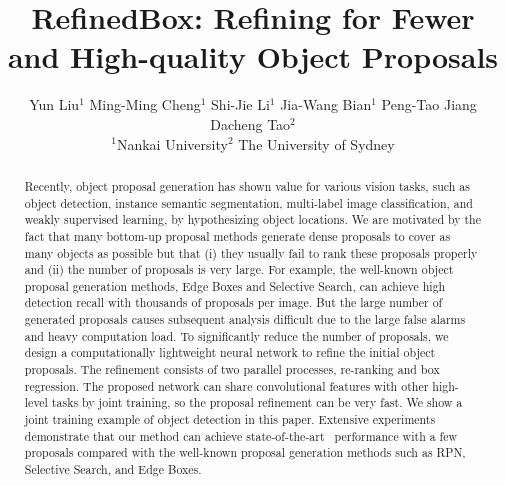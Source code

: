 \documentclass[10pt,twocolumn,letterpaper]{article}
\def\sArt{{state-of-the-art~}}
\begin{document}
\title{RefinedBox: Refining for Fewer and High-quality Object Proposals}

\author{Yun Liu$^1$ \quad Ming-Ming Cheng$^1$ \quad Shi-Jie Li$^1$
\quad Jia-Wang Bian$^1$ \quad Peng-Tao Jiang \quad Dacheng Tao$^2$ \\
$^1$Nankai University\quad\quad$^2$ The University of Sydney
}

\maketitle


\begin{abstract}
%
%
Recently, object proposal generation has shown value for various 
vision tasks, such as object detection, instance semantic segmentation,
multi-label image classification, and weakly supervised learning, by 
hypothesizing object locations.
%
We are motivated by the fact that many bottom-up proposal methods generate 
dense proposals to cover as many objects as possible but that 
(i) they usually fail to rank these proposals properly and 
(ii) the number of proposals is very large.
%
For example, the well-known object proposal generation methods, Edge Boxes
and Selective Search, can achieve high detection recall with thousands of
proposals per image.
But the large number of generated proposals causes subsequent analysis
difficult due to the large false alarms and heavy computation load.
%
To significantly reduce the number of proposals, we design a computationally
lightweight neural network to refine the initial object proposals.
The refinement consists of two parallel processes, re-ranking and box regression.
The proposed network can share convolutional features with other high-level 
tasks by joint training, so the proposal refinement can be very fast.
We show a joint training example of object detection in this paper.
%
Extensive experiments demonstrate that our method can achieve \sArt 
performance with a few proposals compared with the well-known proposal 
generation methods such as RPN, Selective Search, and Edge Boxes.
\end{abstract}
\end{document}
